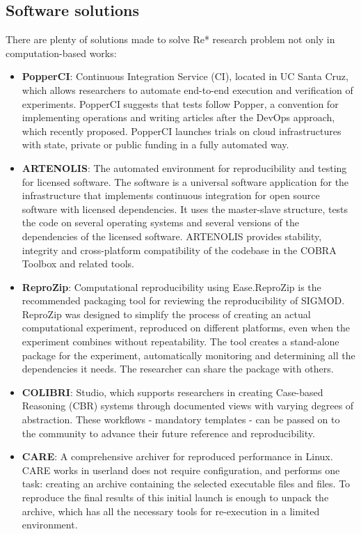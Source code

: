 \documentclass{vldb}
\begin{document}
\subsection{Software solutions}
There are plenty of solutions made to solve Re* research problem not only in computation-based works:
\begin{itemize}
    \item \textbf{PopperCI}\cite{DBLP:conf/infocom/JimenezAALMMR17}: Continuous Integration Service (CI), located in UC Santa Cruz, which allows researchers to automate end-to-end execution and verification of experiments. PopperCI suggests that tests follow Popper, a convention for implementing operations and writing articles after the DevOps approach, which recently proposed. PopperCI launches trials on cloud infrastructures with state, private or public funding in a fully automated way. 
    \item \textbf{ARTENOLIS}\cite{DBLP:journals/corr/abs-1712-05236}: The automated environment for reproducibility and testing for licensed software. The software is a universal software application for the infrastructure that implements continuous integration for open source software with licensed dependencies. It uses the master-slave structure, tests the code on several operating systems and several versions of the dependencies of the licensed software. ARTENOLIS provides stability, integrity and cross-platform compatibility of the codebase in the COBRA Toolbox and related tools.
    \item \textbf{ReproZip}\cite{DBLP:conf/sigmod/ChirigatiRSF16}: Computational reproducibility using Ease.ReproZip is the recommended packaging tool for reviewing the reproducibility of SIGMOD. ReproZip was designed to simplify the process of creating an actual computational experiment, reproduced on different platforms, even when the experiment combines without repeatability. The tool creates a stand-alone package for the experiment, automatically monitoring and determining all the dependencies it needs. The researcher can share the package with others.
    \item \textbf{COLIBRI}\cite{DBLP:conf/iccbr/Recio-GarciaDG13}: Studio, which supports researchers in creating Case-based Reasoning (CBR) systems through documented views with varying degrees of abstraction. These workflows - mandatory templates - can be passed on to the community to advance their future reference and reproducibility.
    \item \textbf{CARE}\cite{DBLP:conf/pldi/JaninVD14}: A comprehensive archiver for reproduced performance in Linux. CARE works in userland does not require configuration, and performs one task: creating an archive containing the selected executable files and files. To reproduce the final results of this initial launch is enough to unpack the archive, which has all the necessary tools for re-execution in a limited environment.

\end{itemize}
\end{document}
